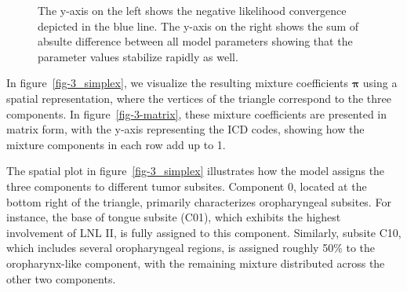 \documentclass[
  sn-mathphys-num,
]{sn-jnl}
\begin{document}
\begin{figure}


\caption{\label{fig-convergence}The y-axis on the left shows the
negative likelihood convergence depicted in the blue line. The y-axis on
the right shows the sum of absulte difference between all model
parameters showing that the parameter values stabilize rapidly as well.}

\end{figure}%

In figure~\ref{fig-3_simplex}, we visualize the resulting mixture
coefficients \(\boldsymbol{\pi}\) using a spatial representation, where
the vertices of the triangle correspond to the three components. In
figure~\ref{fig-3-matrix}, these mixture coefficients are presented in
matrix form, with the y-axis representing the ICD codes, showing how the
mixture components in each row add up to 1.

The spatial plot in figure~\ref{fig-3_simplex} illustrates how the model
assigns the three components to different tumor subsites. Component 0,
located at the bottom right of the triangle, primarily characterizes
oropharyngeal subsites. For instance, the base of tongue subsite (C01),
which exhibits the highest involvement of LNL II, is fully assigned to
this component. Similarly, subsite C10, which includes several
oropharyngeal regions, is assigned roughly 50\% to the oropharynx-like
component, with the remaining mixture distributed across the other two
components.
\end{document}

